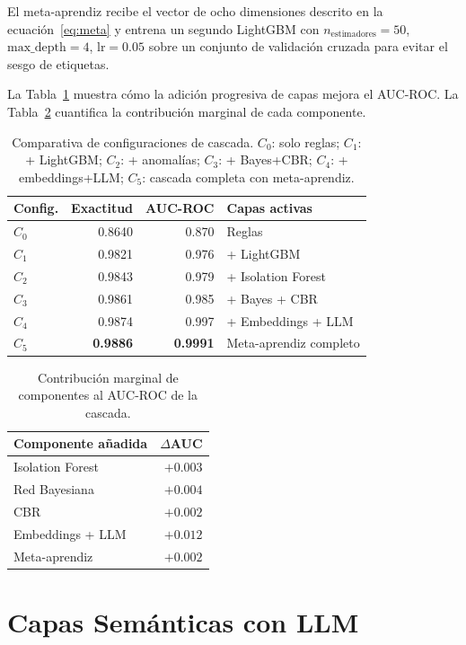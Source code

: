 \documentclass{llncs}
\begin{document}
El meta-aprendiz recibe el vector de ocho dimensiones descrito en
la ecuación~\eqref{eq:meta} y entrena un segundo LightGBM con
$n_{\mathrm{estimadores}}=50$, $\mathrm{max\_depth}=4$,
$\mathrm{lr}=0.05$ sobre un conjunto de validación cruzada
para evitar el sesgo de etiquetas.

La Tabla~\ref{tab:cascade} muestra cómo la adición progresiva
de capas mejora el AUC-ROC.
La Tabla~\ref{tab:components} cuantifica la contribución marginal
de cada componente.

\begin{table}[t]
\caption{Comparativa de configuraciones de cascada.
$C_0$: solo reglas; $C_1$: + LightGBM; $C_2$: + anomalías;
$C_3$: + Bayes+CBR; $C_4$: + embeddings+LLM;
$C_5$: cascada completa con meta-aprendiz.}
\label{tab:cascade}
\centering
\begin{tabular}{lrrl}
\toprule
Config. & Exactitud & AUC-ROC & Capas activas \\
\midrule
$C_0$ & 0.8640 & 0.870 & Reglas \\
$C_1$ & 0.9821 & 0.976 & + LightGBM \\
$C_2$ & 0.9843 & 0.979 & + Isolation Forest \\
$C_3$ & 0.9861 & 0.985 & + Bayes + CBR \\
$C_4$ & 0.9874 & 0.997 & + Embeddings + LLM \\
$C_5$ & \textbf{0.9886} & \textbf{0.9991} & Meta-aprendiz completo \\
\bottomrule
\end{tabular}
\end{table}

\begin{table}[t]
\caption{Contribución marginal de componentes al AUC-ROC de la cascada.}
\label{tab:components}
\centering
\begin{tabular}{lr}
\toprule
Componente añadida & $\Delta$AUC \\
\midrule
Isolation Forest   & $+0.003$ \\
Red Bayesiana      & $+0.004$ \\
CBR                & $+0.002$ \\
Embeddings + LLM   & $+0.012$ \\
Meta-aprendiz      & $+0.002$ \\
\bottomrule
\end{tabular}
\end{table}

\section{Capas Semánticas con LLM}
\label{sec:llm}
\end{document}
